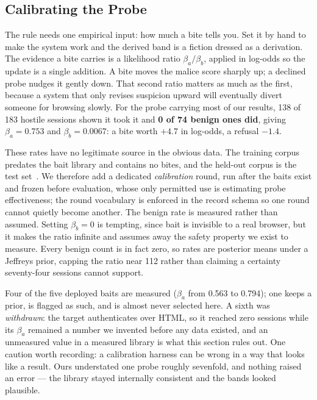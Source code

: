 \documentclass[runningheads]{llncs}
\begin{document}

\subsection{Calibrating the Probe}
\label{sec:calibration}

The rule needs one empirical input: how much a bite tells you. Set it by hand to make
the system work and the derived band is a fiction dressed as a derivation. The
evidence a bite carries is a likelihood ratio $\beta_a/\beta_b$, applied in log-odds
so the update is a single addition. A bite moves the malice score sharply up; a
declined probe nudges it gently down. That second ratio matters as much as the first,
because a system that only revises suspicion upward will eventually divert someone
for browsing slowly. For the probe carrying most of our results, 138 of 183 hostile
sessions shown it took it and \textbf{0 of 74 benign ones did}, giving $\beta_a =
0.753$ and $\beta_b = 0.0067$: a bite worth $+4.7$ in log-odds, a refusal $-1.4$.

These rates have no legitimate source in the obvious data. The training corpus
predates the bait library and contains no bites, and the held-out corpus is the test
set~\cite{arp2022dos}. We therefore add a dedicated \emph{calibration} round, run
after the baits exist and frozen before evaluation, whose only permitted use is
estimating probe effectiveness; the round vocabulary is enforced in the record schema
so one round cannot quietly become another. The benign rate is measured rather than
assumed. Setting $\beta_b = 0$ is tempting, since bait is invisible to a real
browser, but it makes the ratio infinite and assumes away the safety property we
exist to measure. Every benign count is in fact zero, so rates are posterior means
under a Jeffreys prior, capping the ratio near 112 rather than claiming a certainty
seventy-four sessions cannot support.

Four of the five deployed baits are measured ($\beta_a$ from 0.563 to 0.794); one
keeps a prior, is flagged as such, and is almost never selected here. A sixth was
\emph{withdrawn}: the target authenticates over HTML, so it reached zero sessions
while its $\beta_a$ remained a number we invented before any data existed, and an
unmeasured value in a measured library is what this section rules out. One caution
worth recording: a calibration harness can be wrong in a way that looks like a
result. Ours understated one probe roughly sevenfold, and nothing raised an error ---
the library stayed internally consistent and the bands looked plausible.
\end{document}

